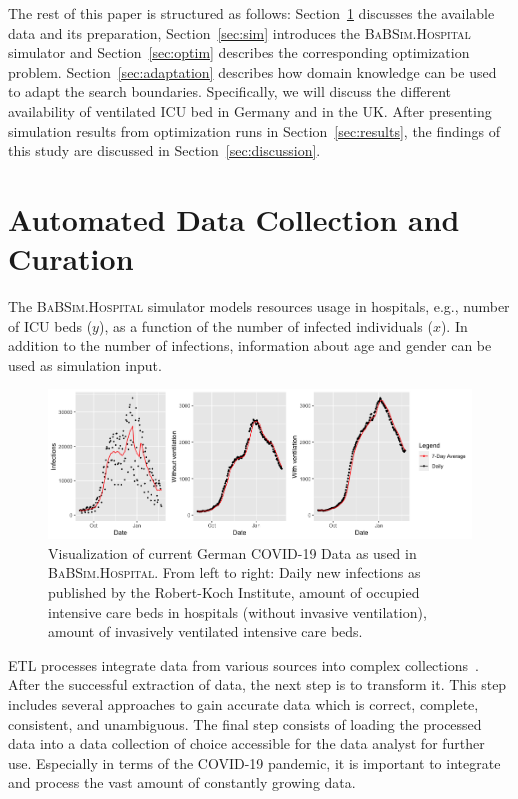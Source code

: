 \documentclass[conference]{IEEEtran}
\newcommand{\babsimhospital}{\textsc{BaBSim.Hospital}\xspace}
\begin{document}
The rest of this paper is structured as follows: 
Section~\ref{sec:data} discusses the available data and its preparation,
Section~\ref{sec:sim} introduces the \babsimhospital simulator and 
Section~\ref{sec:optim} describes the corresponding optimization problem. 
Section~\ref{sec:adaptation} describes how domain knowledge can be used to adapt the search boundaries.
Specifically, we will discuss the different availability of ventilated \gls{ICU} bed in Germany and in the UK.
After presenting simulation results from optimization runs in  Section~\ref{sec:results}, the findings of this study are discussed in Section~\ref{sec:discussion}.

\section{Automated Data Collection and Curation}\label{sec:data}
The \babsimhospital simulator models 
 resources usage in hospitals, e.g., number of \gls{ICU} beds ($y$), as a function 
of the number of infected individuals ($x$).
In addition to the number of infections, information about age and gender can be used as simulation input.
\begin{figure}[tb]
    \centering
    \includegraphics[width=0.97\linewidth]{rkiDiviData.png}
    \caption{Visualization of current German COVID-19 Data as used in \babsimhospital. From left to right: Daily new infections as published by the Robert-Koch Institute, amount of occupied intensive care beds in hospitals (without invasive ventilation), amount of invasively ventilated intensive care beds.}
\label{fig:rki}
\end{figure}
\gls{ETL} processes integrate data from various sources into complex collections~\cite{ELSAPPAGH201191}. 
After the successful extraction of data, the next step is to transform it. 
This step includes several approaches to gain accurate data which is correct, complete, consistent, and unambiguous.  
The final step consists of loading the processed data into a data collection of choice accessible for the data analyst for further use.
Especially in terms of the COVID-19 pandemic, it is important to integrate and process the vast amount of constantly growing data. 
\end{document}
